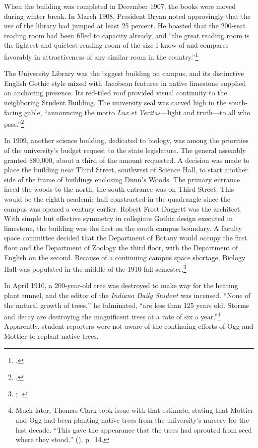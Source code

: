 \documentclass[
  american,
  letterpaper,
]{scrreprt}
\begin{document}
When the building was completed in December 1907, the books were moved
during winter break. In March 1908, President Bryan noted approvingly
that the use of the library had jumped at least 25 percent. He boasted
that the 200-seat reading room had been filled to capacity already, and
``the great reading room is the lightest and quietest reading room of
the size I know of and compares favorably in attractiveness of any
similar room in the country.''\footnote{.}

The University Library was the biggest building on campus, and its
distinctive English Gothic style mixed with Jacobean features in native
limestone supplied an anchoring presence. Its red-tiled roof provided
visual continuity to the neighboring Student Building. The university
seal was carved high in the south-facing gable, ``announcing the motto
\emph{Lux et Veritas}---light and truth---to all who pass.''\footnote{.}

In 1909, another science building, dedicated to biology, was among the
priorities of the university's budget request to the state legislature.
The general assembly granted \$80,000, about a third of the amount
requested. A decision was made to place the building near Third Street,
southwest of Science Hall, to start another side of the frame of
buildings enclosing Dunn's Woods. The primary entrance faced the woods
to the north; the south entrance was on Third Street. This would be the
eighth academic hall constructed in the quadrangle since the campus was
opened a century earlier. Robert Frost Daggett was the architect. With
simple but effective symmetry in collegiate Gothic design executed in
limestone, the building was the first on the south campus boundary. A
faculty space committee decided that the Department of Botany would
occupy the first floor and the Department of Zoology the third floor,
with the Department of English on the second. Because of a continuing
campus space shortage, Biology Hall was populated in the middle of the
1910 fall semester.\footnote{;
  .}

In April 1910, a 200-year-old tree was destroyed to make way for the
heating plant tunnel, and the editor of the \emph{Indiana Daily Student}
was incensed. ``None of the natural growth of trees,'' he fulminated,
``are less than 125 years old. Storms and decay are destroying the
magnificent trees at a rate of six a year.''\footnote{Much later, Thomas
  Clark took issue with that estimate, stating that Mottier and Ogg had
  been planting native trees from the university's nursery for the last
  decade. ``This gave the appearance that the trees had sprouted from
  seed where they stood,'' (), p.~14.} Apparently, student reporters were not
aware of the continuing efforts of Ogg and Mottier to replant native
trees.
\end{document}
